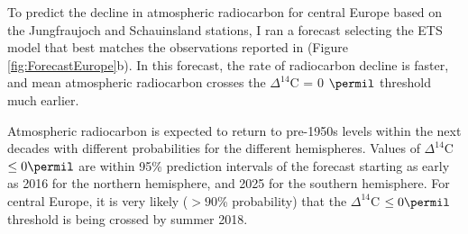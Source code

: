 
To predict the decline in atmospheric radiocarbon for central Europe based on the Jungfraujoch and Schauinsland stations, I ran a forecast selecting the ETS model that best matches the observations reported in \citet{Levin2013Tellus} (Figure \ref{fig:ForecastEurope}b). In this forecast, the rate of radiocarbon decline is faster, and mean atmospheric radiocarbon crosses the $\Delta^{14}$C = 0 $\permil$ threshold much earlier.


Atmospheric radiocarbon is expected to return to pre-1950s levels within the next decades with different probabilities for the different hemispheres. Values of $\Delta^{14}$C $\leq 0 \permil$ are within 95\% prediction intervals of the forecast starting as early as 2016 for the northern hemisphere, and 2025 for the southern hemisphere. For central Europe, it is very likely ($> 90$\% probability) that the $\Delta^{14}$C $\leq 0 \permil$ threshold is being crossed by summer 2018.



